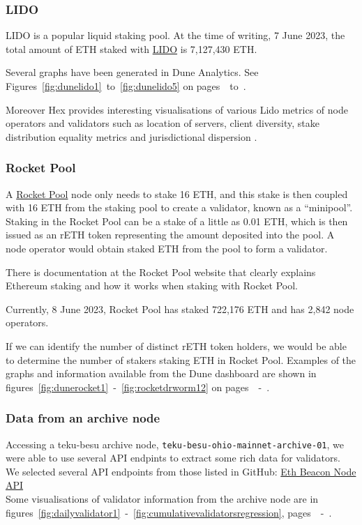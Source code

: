 \documentclass[UTF8]{article}
\begin{document}
{\subsubsection*{LIDO}
LIDO is a popular liquid staking pool. 
At the time of writing, 7 June 2023, the total amount of ETH staked with \href{https://lido.fi/ethereum}{LIDO}  is 7,127,430 ETH. 

Several graphs have been generated in Dune Analytics. See Figures~\ref{fig:dunelido1}~to~\ref{fig:dunelido5} on pages~\pageref{fig:dunelido1}~to~\pageref{fig:dunelido5}.

Moreover Hex provides interesting visualisations of various Lido metrics of node operators and validators such as location of servers, client diversity, stake distribution equality metrics
 and jurisdictional dispersion \cite{lidodoc}. 

\subsubsection*{Rocket Pool}
A \href{https://rocketpool.net/}{Rocket Pool} node only needs to stake 16 ETH, and this stake is then coupled with 16 ETH from the staking pool to create a validator, known as a ``minipool''.  Staking in the Rocket Pool can be a stake of a little as 0.01 ETH, which is then issued as an rETH token representing the amount deposited into the pool. A node operator would obtain staked ETH from the pool to form a validator.

There is documentation at the Rocket Pool website that clearly explains Ethereum staking and how it works when staking with Rocket Pool.

Currently, 8 June 2023, Rocket Pool has staked 722,176 ETH and has 2,842 node operators.

If we can identify the number of distinct rETH token holders, we would be able to determine the number of stakers staking ETH in Rocket Pool. 
Examples of the graphs and information available from the Dune dashboard are shown in figures~\ref{fig:dunerocket1}~-~\ref{fig:rocketdrworm12} on pages~\pageref{fig:dunerocket1}~-~\pageref{fig:rocketdrworm12}.

\subsubsection*{Data from an archive node}
Accessing a teku-besu archive node, \texttt{teku-besu-ohio-mainnet-archive-01},  we were able to use several API endpints to extract some rich data for validators.\\
	 We selected several API endpoints from those listed in GitHub: \href{https://ethereum.github.io/beacon-APIs/?urls.primaryName=dev}{Eth Beacon Node API}\\
	 Some visualisations of validator information from the archive node are in figures~\ref{fig:dailyvalidator1}~-~\ref{fig:cumulativevalidatorsregression}, pages~\pageref{fig:dailyvalidator1}~-~\pageref{fig:cumulativevalidatorsregression}.
	 
}
\end{document}

